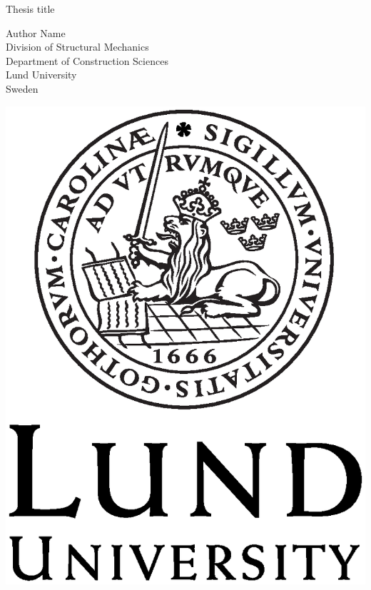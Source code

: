 \documentclass[twoside,openright,11pt]{book}
\begin{document}


\frontmatter

\begin{titlepage}
  \center
  \null
  \vspace{6cm}
  
  {\Huge Thesis title}

  \vspace{2cm}
  
  \Large{Author Name \\ Division of Structural Mechanics \\ Department of Construction Sciences \\ Lund University \\ Sweden}
  \vspace{1cm}
  
  \includegraphics[scale=0.3]{LundUniversity_C2line_BLACK.eps}
\end{titlepage} 
\end{document}
